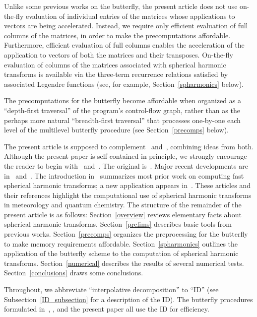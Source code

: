 \documentclass[final,3p,times]{elsarticle}
\begin{document}
Unlike some previous works on the butterfly,
the present article does not use on-the-fly evaluation
of individual entries of the matrices
whose applications to vectors are being accelerated.
Instead, we require only efficient evaluation of full columns of the matrices,
in order to make the precomputations affordable.
Furthermore, efficient evaluation of full columns enables
the acceleration of the application to vectors
of both the matrices and their transposes.
On-the-fly evaluation of columns of the matrices
associated with spherical harmonic transforms is available
via the three-term recurrence relations
satisfied by associated Legendre functions
(see, for example, Section~\ref{spharmonics} below).

The precomputations for the butterfly become affordable when organized
as a ``depth-first traversal'' of the program's control-flow graph,
rather than as the perhaps more natural ``breadth-first traversal''
that processes one-by-one each level of the multilevel butterfly procedure
(see Section~\ref{precomps} below).

The present article is supposed to complement~\cite{oneil-woolfe-rokhlin}
and~\cite{tygert_sph}, combining ideas from both.
Although the present paper is self-contained in principle,
we strongly encourage the reader to begin with~\cite{oneil-woolfe-rokhlin}
and~\cite{tygert_sph}.
The original is~\cite{michielssen-boag}.
Major recent developments are in~\cite{candes-demanet-ying} and~\cite{ying}.
The introduction in~\cite{tygert_sph} summarizes
most prior work on computing fast spherical harmonic transforms;
a new application appears in~\cite{reuter-ratner-seideman}.
These articles and their references highlight the computational use
of spherical harmonic transforms in meteorology and quantum chemistry.
The structure of the remainder of the present article is as follows:
Section~\ref{overview} reviews elementary facts
about spherical harmonic transforms.
Section~\ref{prelims} describes basic tools from previous works.
Section~\ref{precomps} organizes the preprocessing for the butterfly
to make memory requirements affordable.
Section~\ref{spharmonics} outlines the application of the butterfly scheme
to the computation of spherical harmonic transforms.
Section~\ref{numerical} describes the results of several numerical tests.
Section~\ref{conclusions} draws some conclusions.

Throughout, we abbreviate ``interpolative decomposition'' to ``ID''
(see Subsection~\ref{ID_subsection} for a description of the ID).
The butterfly procedures formulated in~\cite{michielssen-boag},
\cite{oneil-woolfe-rokhlin}, and the present paper
all use the ID for efficiency.
\end{document}
